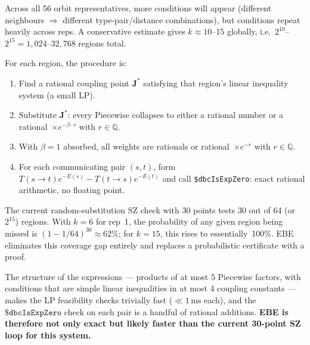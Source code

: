 \documentclass[11pt,a4paper]{article}
\begin{document}
Across all 56 orbit representatives, more conditions will appear (different
neighbours $\Rightarrow$ different type-pair/distance combinations), but
conditions repeat heavily across reps.  A conservative estimate gives
$k\approx 10$--$15$ globally, i.e.\ $2^{10}$--$2^{15}=1{,}024$--$32{,}768$
regions total.

For each region, the procedure is:
\begin{enumerate}
  \item Find a rational coupling point $\mathbf{J}^*$ satisfying that region's
    linear inequality system (a small LP).
  \item Substitute $\mathbf{J}^*$: every Piecewise collapses to either
    a rational number or a rational~$\times e^{-\beta\cdot r}$ with
    $r\in\mathbb{Q}$.
  \item With $\beta=1$ absorbed, all weights are rationals or
    rational~$\times e^{-r}$ with $r\in\mathbb{Q}$.
  \item For each communicating pair $(s,t)$, form
    $T(s{\to}t)e^{-E(s)}-T(t{\to}s)e^{-E(t)}$ and call
    \texttt{\$dbcIsExpZero}: exact rational arithmetic, no floating point.
\end{enumerate}

The current random-substitution SZ check with 30 points tests 30 out of
64 (or $2^{15}$) regions.  With $k=6$ for rep~1, the probability of any
given region being missed is $(1-1/64)^{30}\approx62\%$; for $k=15$,
this rises to essentially~100\%.  EBE eliminates this coverage gap entirely
and replaces a probabilistic certificate with a proof.

The structure of the expressions --- products of at most 5 Piecewise factors,
with conditions that are simple linear inequalities in at most 4 coupling
constants --- makes the LP feasibility checks trivially fast
($\ll 1\,\text{ms}$ each), and the $\texttt{\$dbcIsExpZero}$ check on each
pair is a handful of rational additions.  \textbf{EBE is therefore not only
exact but likely faster than the current 30-point SZ loop for this system.}
\end{document}
